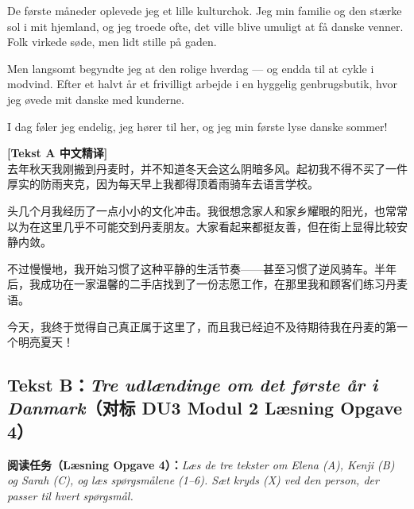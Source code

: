 De første måneder oplevede jeg et lille kulturchok. Jeg  min familie og den stærke sol i mit hjemland, og jeg troede ofte,  det ville blive umuligt at få danske venner. Folk virkede søde, men lidt stille på gaden.

Men langsomt begyndte jeg at  den rolige hverdag --- og endda til at cykle i modvind. Efter et halvt år  et frivilligt arbejde i en hyggelig genbrugsbutik, hvor jeg øvede mit danske med kunderne.

I dag føler jeg endelig,  jeg hører til her, og jeg  min første lyse danske sommer!

\begin{transbox}
\small
\textbf{\color{NCDTeal}[Tekst A 中文精译]}\\
去年秋天我刚搬到丹麦时，并不知道冬天会这么阴暗多风。起初我不得不买了一件厚实的防雨夹克，因为每天早上我都得顶着雨骑车去语言学校。

头几个月我经历了一点小小的文化冲击。我很想念家人和家乡耀眼的阳光，也常常以为在这里几乎不可能交到丹麦朋友。大家看起来都挺友善，但在街上显得比较安静内敛。

不过慢慢地，我开始习惯了这种平静的生活节奏——甚至习惯了逆风骑车。半年后，我成功在一家温馨的二手店找到了一份志愿工作，在那里我和顾客们练习丹麦语。

今天，我终于觉得自己真正属于这里了，而且我已经迫不及待期待我在丹麦的第一个明亮夏天！
\end{transbox}

\subsection*{Tekst B：\textit{Tre udlændinge om det første år i Danmark}（对标 DU3 Modul 2 Læsning Opgave 4）}

\textbf{阅读任务（Læsning Opgave 4）：}\textit{Læs de tre tekster om Elena (A), Kenji (B) og Sarah (C), og læs spørgsmålene (1--6). Sæt kryds (X) ved den person, der passer til hvert spørgsmål.}

